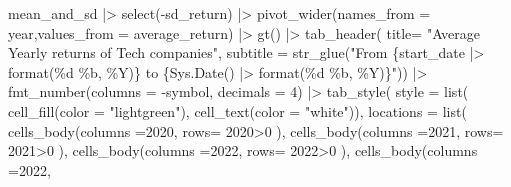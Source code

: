 \documentclass[
  12pt]{article}
\newenvironment{Shaded}{\begin{snugshade}}{\end{snugshade}}
\newcommand{\AttributeTok}[1]{\textcolor[rgb]{0.40,0.45,0.13}{#1}}
\newcommand{\DecValTok}[1]{\textcolor[rgb]{0.68,0.00,0.00}{#1}}
\newcommand{\FunctionTok}[1]{\textcolor[rgb]{0.28,0.35,0.67}{#1}}
\newcommand{\NormalTok}[1]{\textcolor[rgb]{0.00,0.23,0.31}{#1}}
\newcommand{\SpecialCharTok}[1]{\textcolor[rgb]{0.37,0.37,0.37}{#1}}
\newcommand{\StringTok}[1]{\textcolor[rgb]{0.13,0.47,0.30}{#1}}
\theoremstyle{definition}
\theoremstyle{remark}
\begin{document}
\begin{Shaded}
\begin{Highlighting}[]
\NormalTok{mean\_and\_sd }\SpecialCharTok{|\textgreater{}} 
  \FunctionTok{select}\NormalTok{(}\SpecialCharTok{{-}}\NormalTok{sd\_return) }\SpecialCharTok{|\textgreater{}} 
  \FunctionTok{pivot\_wider}\NormalTok{(}\AttributeTok{names\_from =}\NormalTok{ year,}\AttributeTok{values\_from =}\NormalTok{ average\_return) }\SpecialCharTok{|\textgreater{}} 
  \FunctionTok{gt}\NormalTok{() }\SpecialCharTok{|\textgreater{}} 
  \FunctionTok{tab\_header}\NormalTok{(}
    \AttributeTok{title=} \StringTok{"Average Yearly returns of Tech companies"}\NormalTok{,}
    \AttributeTok{subtitle  =} \FunctionTok{str\_glue}\NormalTok{(}\StringTok{"From \{start\_date |\textgreater{} format(\textquotesingle{}\%d \%b, \%Y\textquotesingle{})\} to \{Sys.Date() |\textgreater{} format(\textquotesingle{}\%d \%b, \%Y\textquotesingle{})\}"}\NormalTok{)) }\SpecialCharTok{|\textgreater{}} 
  \FunctionTok{fmt\_number}\NormalTok{(}\AttributeTok{columns =} \SpecialCharTok{{-}}\NormalTok{symbol, }\AttributeTok{decimals  =} \DecValTok{4}\NormalTok{) }\SpecialCharTok{|\textgreater{}} 
  \FunctionTok{tab\_style}\NormalTok{(}
    \AttributeTok{style =} \FunctionTok{list}\NormalTok{(}
      \FunctionTok{cell\_fill}\NormalTok{(}\AttributeTok{color =} \StringTok{"lightgreen"}\NormalTok{), }
      \FunctionTok{cell\_text}\NormalTok{(}\AttributeTok{color =} \StringTok{"white"}\NormalTok{)), }
    \AttributeTok{locations =} \FunctionTok{list}\NormalTok{(}
      \FunctionTok{cells\_body}\NormalTok{(}\AttributeTok{columns =}\StringTok{\textasciigrave{}}\AttributeTok{2020}\StringTok{\textasciigrave{}}\NormalTok{, }
                 \AttributeTok{rows=} \StringTok{\textasciigrave{}}\AttributeTok{2020}\StringTok{\textasciigrave{}}\SpecialCharTok{\textgreater{}}\DecValTok{0}\NormalTok{ ), }
      \FunctionTok{cells\_body}\NormalTok{(}\AttributeTok{columns =}\StringTok{\textasciigrave{}}\AttributeTok{2021}\StringTok{\textasciigrave{}}\NormalTok{, }
                 \AttributeTok{rows=} \StringTok{\textasciigrave{}}\AttributeTok{2021}\StringTok{\textasciigrave{}}\SpecialCharTok{\textgreater{}}\DecValTok{0}\NormalTok{ ), }
       \FunctionTok{cells\_body}\NormalTok{(}\AttributeTok{columns =}\StringTok{\textasciigrave{}}\AttributeTok{2022}\StringTok{\textasciigrave{}}\NormalTok{, }
                 \AttributeTok{rows=} \StringTok{\textasciigrave{}}\AttributeTok{2022}\StringTok{\textasciigrave{}}\SpecialCharTok{\textgreater{}}\DecValTok{0}\NormalTok{ ), }
       \FunctionTok{cells\_body}\NormalTok{(}\AttributeTok{columns =}\StringTok{\textasciigrave{}}\AttributeTok{2022}\StringTok{\textasciigrave{}}\NormalTok{, }

\end{Highlighting}
\end{Shaded}
\end{document}
